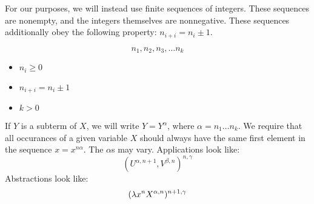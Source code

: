 For our purposes, we will instead use finite sequences of integers. These sequences are nonempty, and the integers themselves are nonnegative. These sequences additionally obey the following property: $n_{i + i} = n_i \pm 1$.

\begin{equation*}
  n_1,n_2,n_3,\ldots n_k
\end{equation*}
\begin{itemize}
  \item $n_i \geq 0$
  \item $n_{i + i} = n_i \pm 1$
  \item $k > 0$
\end{itemize}
If $Y$ is a subterm of $X$, we will write $Y = Y^\alpha$, where $\alpha = n_1\ldots n_k$. We require that all occurances of a given variable $X$ should always have the same first element in the sequence $x = x^{n\alpha}$. The $\alpha$s may vary. Applications look like:
\begin{equation*}
  (U^{\alpha,{n+1}},V^{\beta,n})^{n,\gamma}
\end{equation*}
Abstractions look like:
\begin{equation*}
  (\lambda x^{n} X^{\alpha,n})^{n + 1,\gamma}
\end{equation*}